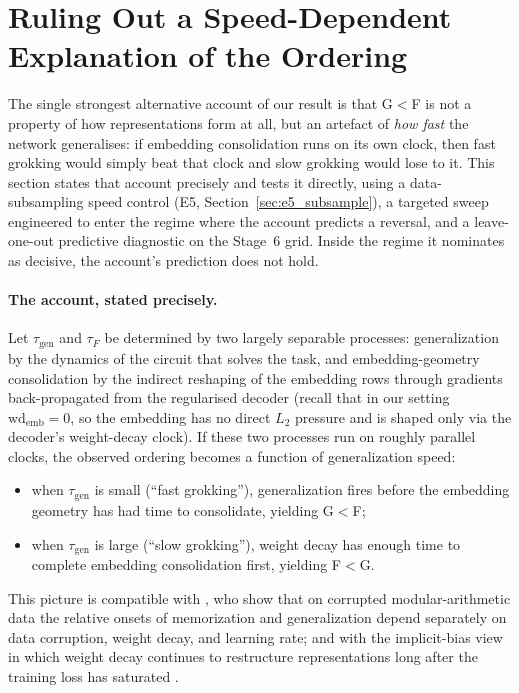 \documentclass{article}
\newcommand{\taug}{\tau_{\mathrm{gen}}}
\newcommand{\tauf}{\tau_{F}}
\begin{document}
\section{Ruling Out a Speed-Dependent Explanation of the Ordering}
\label{sec:speed}

The single strongest alternative account of our result is that
G$<$F is not a property of how representations form at all, but an
artefact of \emph{how fast} the network generalises: if embedding
consolidation runs on its own clock, then fast grokking would
simply beat that clock and slow grokking would lose to it.
This section states that account precisely and tests it directly,
using a data-subsampling speed control (E5,
Section~\ref{sec:e5_subsample}), a targeted sweep engineered to
enter the regime where the account predicts a reversal, and a
leave-one-out predictive diagnostic on the Stage~6 grid.
Inside the regime it nominates as decisive, the account's
prediction does not hold.

\paragraph{The account, stated precisely.}
Let $\taug$ and $\tauf$ be determined by two largely separable
processes: generalization by the dynamics of the circuit that
solves the task, and embedding-geometry consolidation by the
indirect reshaping of the embedding rows through gradients
back-propagated from the regularised decoder (recall that in our
setting $\mathrm{wd}_{\mathrm{emb}}{=}0$, so the embedding has no
direct $L_2$ pressure and is shaped only via the decoder's
weight-decay clock).
If these two processes run on roughly parallel clocks, the observed
ordering becomes a function of generalization speed:
\begin{itemize}
  \item when $\taug$ is small (``fast grokking''), generalization
    fires before the embedding geometry has had time to consolidate,
    yielding G$<$F;
  \item when $\taug$ is large (``slow grokking''), weight decay has
    enough time to complete embedding consolidation first, yielding
    F$<$G.
\end{itemize}
This picture is compatible with \citet{doshi2024grok}, who show that
on corrupted modular-arithmetic data the relative onsets of
memorization and generalization depend separately on data corruption,
weight decay, and learning rate; and with the implicit-bias view in
which weight decay continues to restructure representations long
after the training loss has saturated \citep{soudry2018implicit,
galanti2024sgd,andriushchenko2023need}.
\end{document}
